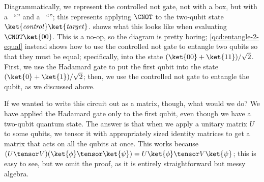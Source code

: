 Diagrammatically, we represent the controlled not gate, not with a box, but with
a ~``\QcircuitDemo[\,]{\control}'' and a
~``\QcircuitDemo{\qctarget}''; this represents applying $\CNOT$ to
the two-qubit state $\ket{\mathit{control}}\ket{\mathit{target}}$.
 shows what this looks like when evaluating $\CNOT\ket{00}$.
This is a no-op, so the diagram is pretty boring; \cref{qcd:entangle-2-equal}
instead shows how to use the controlled not gate to entangle two qubits so that
they must be equal; specifically, into the state $(\ket{00} +
\ket{11})/\sqrt{2}$.  First, we use the Hadamard gate to put the first qubit
into the state $(\ket{0} + \ket{1})/\sqrt{2}$; then, we use the controlled not
gate to entangle the qubit, as we discussed above.

If we wanted to write this circuit out as a matrix, though, what would we do?
We have applied the Hadamard gate only to the first qubit, even though we have a
two-qubit quantum state.  The answer is that when we apply a unitary matrix $U$
to some qubits, we tensor it with appropriately sized identity matrices to get a
matrix that acts on all the qubits at once.  This works because $(U \tensor
V)(\ket{\phi} \tensor \ket{\psi}) = U\ket{\phi} \tensor V\ket{\psi}$; this is
easy to see, but we omit the proof, as it is entirely straightforward but messy
algebra.

